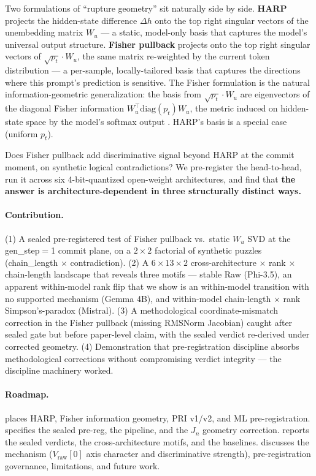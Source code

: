\documentclass[10pt, letterpaper]{article}
\renewcommand{\dh}{\Delta h}
\newcommand{\Wu}{W_u}
\newcommand{\Jn}{J_n}
\begin{document}
Two formulations of ``rupture geometry'' sit naturally side by side.
\textbf{HARP} projects the hidden-state difference $\dh$ onto the top
right singular vectors of the unembedding matrix $\Wu$ --- a static,
model-only basis that captures the model's universal output structure.
\textbf{Fisher pullback} projects onto the top right singular vectors
of $\sqrt{p_t} \cdot \Wu$, the same matrix re-weighted by the current
token distribution --- a per-sample, locally-tailored basis that
captures the directions where this prompt's prediction is sensitive.
The Fisher formulation is the natural information-geometric
generalization: the basis from $\sqrt{p_t} \cdot \Wu$ are eigenvectors
of the diagonal Fisher information $\Wu^\top \mathrm{diag}(p_t) \Wu$,
the metric induced on hidden-state space by the model's softmax output
\citep{amari2016information}. HARP's basis is a special case (uniform
$p_t$).

Does Fisher pullback add discriminative signal beyond HARP at the
commit moment, on synthetic logical contradictions? We pre-register
the head-to-head, run it across six 4-bit-quantized open-weight
architectures, and find that \textbf{the answer is
architecture-dependent in three structurally distinct ways.}

\paragraph{Contribution.}
(1) A sealed pre-registered test of Fisher pullback vs.\ static $\Wu$
SVD at the gen\_step$=$1 commit plane, on a $2\times 2$ factorial of
synthetic puzzles (chain\_length $\times$ contradiction).
(2) A $6 \times 13 \times 2$ cross-architecture $\times$ rank $\times$
chain-length landscape that reveals three motifs --- stable Raw
(Phi-3.5), an apparent within-model rank flip that we show is an
within-model transition with no supported mechanism (Gemma 4B), and within-model
chain-length $\times$ rank Simpson's-paradox (Mistral).
(3) A methodological coordinate-mismatch correction in the Fisher
pullback (missing RMSNorm Jacobian) caught after sealed gate but before
paper-level claim, with the sealed verdict re-derived under corrected
geometry.
(4) Demonstration that pre-registration discipline absorbs
methodological corrections without compromising verdict integrity ---
the discipline machinery worked.

\paragraph{Roadmap.}
 places HARP, Fisher information geometry, PRI
v1/v2, and ML pre-registration.  specifies the sealed
pre-reg, the pipeline, and the $\Jn$ geometry correction.
 reports the sealed verdicts, the cross-architecture
motifs, and the baselines.  discusses the
mechanism ($V_\text{raw}[0]$ axis character and discriminative
strength), pre-registration governance, limitations, and future work.
\end{document}
